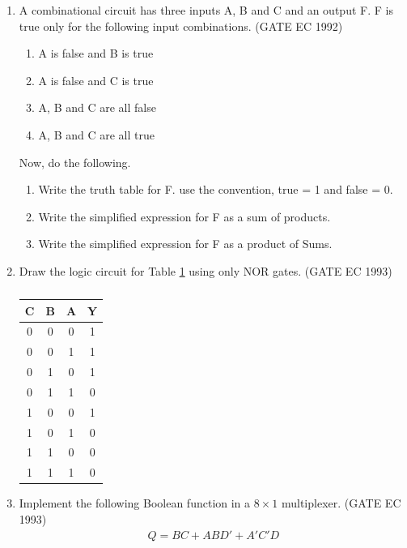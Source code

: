 \begin{enumerate}[label=\arabic*.,ref=\theenumi]
\begin{figure}[H]
\caption{}
\label{fig:1992/gate/ec/1/22}
\end{figure}
\item
	A combinational circuit has three inputs A, B and C and an output F. F is true only for the following input combinations. 
\hfill (GATE EC 1992)
\label{prob:1992/gate/ec/2/9}
	\begin{enumerate}
		\item A is false and B is true 
		\item A is false and C is true 
		\item A, B and C are all false 
		\item A, B and C are all true 
	\end{enumerate}
	Now, do the following.
	\begin{enumerate}
\item Write the truth table for F. use the convention, true = 1 and false = 0. 
\item Write the simplified expression for F as a sum of products. 
\item Write the simplified expression for F as a product of Sums.
\end{enumerate}
\item Draw the logic circuit for Table 
\ref{tab:1993/gate/ec/5/7} using only NOR gates.
\label{prob:1993/gate/ec/5/7}
\hfill (GATE EC 1993)
	\begin{table}[H]
		\centering
		\begin{tabular}{|c|c|c|c|}
\hline
\textbf{C} &\textbf{B} & \textbf{A} & \textbf{Y} \\
\hline
0 & 0 & 0 & 1 \\  
\hline
0 & 0 & 1 & 1 \\ 
\hline
0 & 1 & 0 & 1 \\
\hline
0 & 1 & 1 & 0 \\
\hline
1 & 0 & 0 & 1 \\  
\hline
1 & 0 & 1 & 0 \\ 
\hline
1 & 1 & 0 & 0 \\
\hline
1 & 1 & 1& 0\\
\hline
\end{tabular}
\caption{}
\label{tab:1993/gate/ec/5/7}
\end{table}
\item
	Implement the following Boolean function in a $8\times1$ multiplexer.
\label{prob:1993/gate/ec/14}
\hfill (GATE EC 1993)
		\begin{align*}
 Q = BC + ABD' + A'C'D  
		\end{align*}

\end{enumerate}

